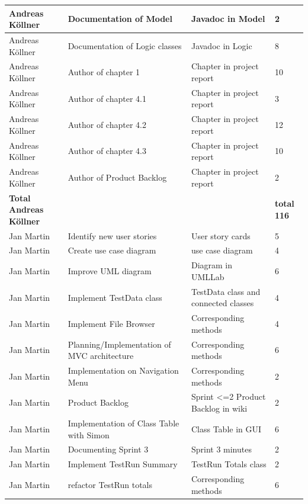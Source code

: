 \begin{longtable}{|p{}||p{}|p{}|p{}|}
    \hline
    Andreas Köllner & Documentation of Model & Javadoc in Model & 2 \\ 
    \hline
    Andreas Köllner & Documentation of Logic classes & Javadoc in Logic & 8 \\ 
    \hline
    Andreas Köllner & Author of chapter 1 & Chapter in project report & 10 \\ 
    \hline
    Andreas Köllner & Author of chapter 4.1 & Chapter in project report & 3 \\ 
    \hline
    Andreas Köllner & Author of chapter 4.2 & Chapter in project report & 12 \\
    \hline 
    Andreas Köllner & Author of chapter 4.3 & Chapter in project report & 10 \\ 
    \hline 
    Andreas Köllner & Author of Product Backlog & Chapter in project report & 2 \\ 
    \hline
    \hline 
    \textbf{Total \newline Andreas Köllner} & & & \textbf{total 116}   \\
    \hline
    \hline
    Jan Martin & Identify new user stories & User story cards & 5 \\
    \hline
    Jan Martin & Create use case diagram & use case diagram & 4 \\ 
    \hline
    Jan Martin & Improve UML diagram & Diagram in UMLLab & 6 \\ 
    \hline  
    Jan Martin & Implement TestData class & TestData class and connected classes & 4 \\ 
    \hline  
    Jan Martin & Implement File Browser & Corresponding methods & 4 \\ 
    \hline
    Jan Martin & Planning/Implementation of MVC architecture & Corresponding methods & 6 \\ 
    \hline  
    Jan Martin & Implementation on Navigation Menu & Corresponding methods & 2 \\ 
    \hline  
    Jan Martin & Product Backlog & Sprint <=2 Product Backlog in wiki & 2 \\ 
    \hline  
    Jan Martin & Implementation of Class Table with Simon & Class Table in GUI & 6 \\ 
    \hline  
    Jan Martin & Documenting Sprint 3 & Sprint 3 minutes & 2 \\ 
    \hline 
    Jan Martin & Implement TestRun Summary & TestRun Totals class & 2 \\ 
    \hline  
    Jan Martin & refactor TestRun totals & Corresponding methods & 6 \\ 

\end{longtable}
